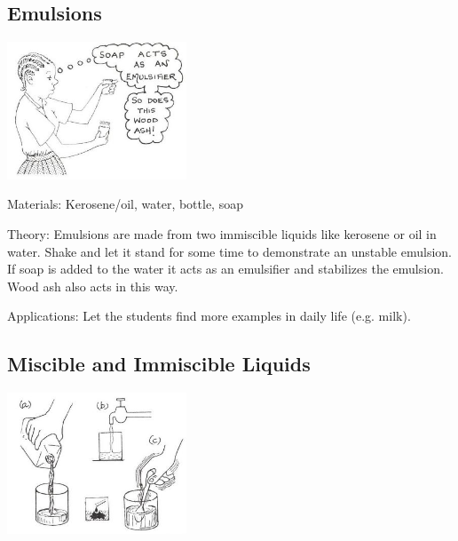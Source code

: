 \begin{multicols}{2}
\subsection{Emulsions} %

\begin{center}
\includegraphics[width=0.4\textwidth]{./img/source/emulsions.jpg}
\end{center}

\begin{description*}
\item[Materials:]{Kerosene/oil, water, bottle, soap}
\item[Theory:]{Emulsions are made from two immiscible
liquids like kerosene or oil in water. Shake and
let it stand for some time to demonstrate an
unstable emulsion. If soap is added to the water
it acts as an emulsifier and stabilizes the
emulsion. Wood ash also acts in this way. }
\item[Applications:]{Let the students find more examples in
daily life (e.g. milk).}
\end{description*}

\subsection{Miscible and Immiscible Liquids} %

\begin{center}
\includegraphics[width=0.4\textwidth]{./img/source/miscible-immiscible.jpg}
\end{center}


\end{multicols}
